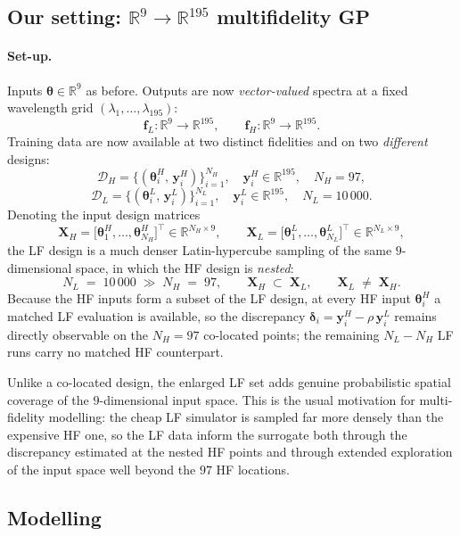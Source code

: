 \documentclass[11pt,a4paper]{article}
\newcommand{\R}{\mathbb{R}}
\newcommand{\T}{^{\!\top}}
\newcommand{\bth}{\bm{\theta}}
\newcommand{\by}{\bm{y}}
\newcommand{\bff}{\bm{f}}
\begin{document}
\subsection{Our setting: $\R^{9} \to \R^{195}$ multifidelity GP}
\label{sec:MF}

\paragraph{Set-up.}
Inputs $\bth \in \R^{9}$ as before. Outputs are now \emph{vector-valued} spectra at a fixed wavelength grid $(\lambda_{1},\ldots,\lambda_{195})$:
\[
\bff_{L}:\R^{9}\to\R^{195}, \qquad \bff_{H}:\R^{9}\to\R^{195}.
\]
Training data are now available at two distinct fidelities and on two
\emph{different} designs:
\[
\mathcal{D}_{H} = \bigl\{(\bth_{i}^{H},\, \by_{i}^{H})\bigr\}_{i=1}^{N_{H}}, \quad
\by_{i}^{H} \in \R^{195}, \quad N_{H}=97,
\]
\[
\mathcal{D}_{L} = \bigl\{(\bth_{i}^{L},\, \by_{i}^{L})\bigr\}_{i=1}^{N_{L}}, \quad
\by_{i}^{L} \in \R^{195}, \quad N_{L}=10\,000.
\]
Denoting the input design matrices
\[
\bm{X}_{H} = \bigl[\bth_{1}^{H},\ldots,\bth_{N_{H}}^{H}\bigr]\T \in \R^{N_{H}\times 9},
\qquad
\bm{X}_{L} = \bigl[\bth_{1}^{L},\ldots,\bth_{N_{L}}^{L}\bigr]\T \in \R^{N_{L}\times 9},
\]
the LF design is a much denser Latin-hypercube sampling of the same
$9$-dimensional space, in which the HF design is \emph{nested}:
\begin{equation}
N_{L} \;=\; 10\,000 \;\gg\; N_{H} \;=\; 97,
\qquad
\bm{X}_{H} \;\subset\; \bm{X}_{L},
\qquad
\bm{X}_{L} \;\neq\; \bm{X}_{H}.
\label{eq:design_nested}
\end{equation}
Because the HF inputs form a subset of the LF design, at every HF input
$\bth_{i}^{H}$ a matched LF evaluation is available, so the discrepancy
$\bm{\delta}_{i} = \by_{i}^{H} - \rho\,\by_{i}^{L}$ remains directly observable
on the $N_{H}=97$ co-located points; the remaining $N_{L}-N_{H}$ LF runs carry
no matched HF counterpart.

\medskip
\noindent Unlike a co-located design, the enlarged LF set adds genuine
probabilistic spatial coverage of the $9$-dimensional input space. This is the
usual motivation for multi-fidelity modelling: the cheap LF simulator is
sampled far more densely than the expensive HF one, so the LF data inform the
surrogate both through the discrepancy estimated at the nested HF points and
through extended exploration of the input space well beyond the $97$ HF
locations.

\subsection{Modelling}
\end{document}
